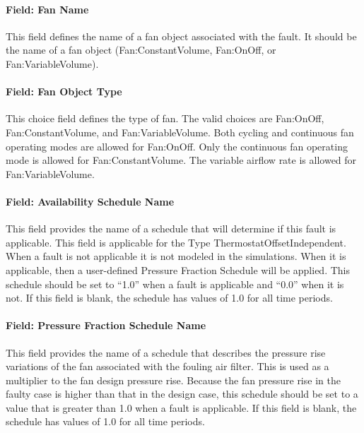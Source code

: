 \paragraph{Field: Fan Name}\label{field-fan-name-002}

This field defines the name of a fan object associated with the fault. It should be the name of a fan object (Fan:ConstantVolume, Fan:OnOff, or Fan:VariableVolume).

\paragraph{Field: Fan Object Type}\label{field-fan-object-type-000}

This choice field defines the type of fan. The valid choices are Fan:OnOff, Fan:ConstantVolume, and Fan:VariableVolume. Both cycling and continuous fan operating modes are allowed for Fan:OnOff. Only the continuous fan operating mode is allowed for Fan:ConstantVolume. The variable airflow rate is allowed for Fan:VariableVolume.

\paragraph{Field: Availability Schedule Name}\label{field-availability-schedule-name-8-002}

This field provides the name of a schedule that will determine if this fault is applicable. This field is applicable for the Type ThermostatOffsetIndependent. When a fault is not applicable it is not modeled in the simulations. When it is applicable, then a user-defined Pressure Fraction Schedule will be applied. This schedule should be set to ``1.0'' when a fault is applicable and ``0.0'' when it is not. If this field is blank, the schedule has values of 1.0 for all time periods.

\paragraph{Field: Pressure Fraction Schedule Name}\label{field-pressure-fraction-schedule-name}

This field provides the name of a schedule that describes the pressure rise variations of the fan associated with the fouling air filter. This is used as a multiplier to the fan design pressure rise. Because the fan pressure rise in the faulty case is higher than that in the design case, this schedule should be set to a value that is greater than 1.0 when a fault is applicable. If this field is blank, the schedule has values of 1.0 for all time periods.

